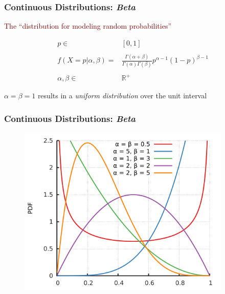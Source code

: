 \documentclass[xcolor={dvipsnames}]{beamer}
\begin{document}
 





\frame
{
 \frametitle{Continuous Distributions: \emph{Beta}}

\large
\textcolor{Maroon}{The ``distribution for modeling random probabilities''}

\vspace{-.75em}
\LARGE

\begin{align*}
p \in {} & [0,1] \\\\
f(X=p|\alpha, \beta) = {} & \frac{\Gamma(\alpha + \beta)}{\Gamma(\alpha)\Gamma(\beta)} p^{\alpha-1} (1-p)^{\beta-1}\\\\
\alpha, \beta \in {} & \mathbb{R}^+
\end{align*}

\vspace{.5em}

\normalsize
\textcolor{NavyBlue}{$\alpha = \beta = 1$ results in a \emph{uniform distribution} over the unit interval}
}

\frame
{
 \frametitle{Continuous Distributions: \emph{Beta}}
 
\begin{figure}
\centering
\includegraphics[width=4in]{stuff/beta.png}
\end{figure}
}

 
 
\end{document}

